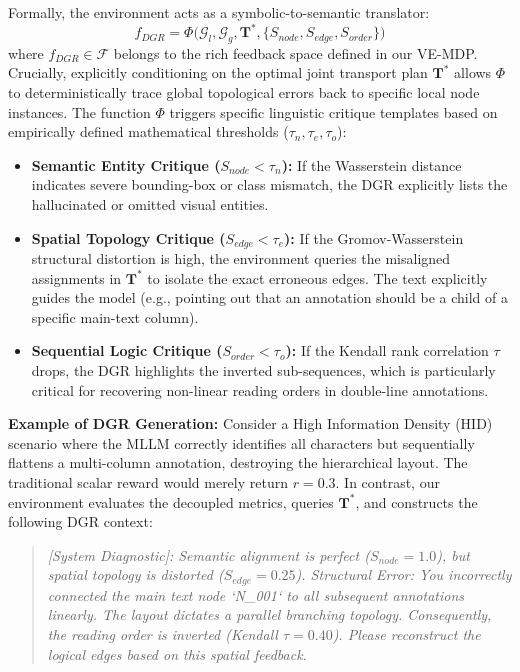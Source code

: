 \documentclass{article}
\begin{document}
Formally, the environment acts as a symbolic-to-semantic translator:
\begin{equation}
    f_{DGR} = \Phi\Big(\mathcal{G}_l, \mathcal{G}_g, \mathbf{T}^*, \{S_{node}, S_{edge}, S_{order}\}\Big)
\end{equation}
where $f_{DGR} \in \mathcal{F}$ belongs to the rich feedback space defined in our VE-MDP. Crucially, explicitly conditioning on the optimal joint transport plan $\mathbf{T}^*$ allows $\Phi$ to deterministically trace global topological errors back to specific local node instances. The function $\Phi$ triggers specific linguistic critique templates based on empirically defined mathematical thresholds ($\tau_n, \tau_e, \tau_o$):

\begin{itemize}
    \item \textbf{Semantic Entity Critique ($S_{node} < \tau_n$):} If the Wasserstein distance indicates severe bounding-box or class mismatch, the DGR explicitly lists the hallucinated or omitted visual entities.
    \item \textbf{Spatial Topology Critique ($S_{edge} < \tau_e$):} If the Gromov-Wasserstein structural distortion is high, the environment queries the misaligned assignments in $\mathbf{T}^*$ to isolate the exact erroneous edges. The text explicitly guides the model (e.g., pointing out that an annotation should be a child of a specific main-text column).
    \item \textbf{Sequential Logic Critique ($S_{order} < \tau_o$):} If the Kendall rank correlation $\tau$ drops, the DGR highlights the inverted sub-sequences, which is particularly critical for recovering non-linear reading orders in double-line annotations.
\end{itemize}

\textbf{Example of DGR Generation:} Consider a High Information Density (HID) scenario where the MLLM correctly identifies all characters but sequentially flattens a multi-column annotation, destroying the hierarchical layout. The traditional scalar reward would merely return $r = 0.3$. In contrast, our environment evaluates the decoupled metrics, queries $\mathbf{T}^*$, and constructs the following DGR context:

\begin{quote}
    \textit{[System Diagnostic]: Semantic alignment is perfect ($S_{node} = 1.0$), but spatial topology is distorted ($S_{edge} = 0.25$). Structural Error: You incorrectly connected the main text node `N\_001` to all subsequent annotations linearly. The layout dictates a parallel branching topology. Consequently, the reading order is inverted (Kendall $\tau = 0.40$). Please reconstruct the logical edges based on this spatial feedback.}
\end{quote}
\end{document}
